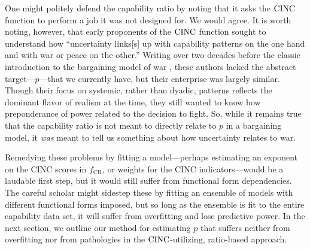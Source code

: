 One might politely defend the capability ratio by noting that it asks the $\operatorname{CINC}$ function to perform a job it was not designed for.
We would agree.
It is worth noting, however, that early proponents of the $\operatorname{CINC}$ function \citep[24]{singer1972} sought to understand how ``uncertainty links[s] up with capability patterns on the one hand and with war or peace on the other.''
Writing over two decades before the classic introduction to the bargaining model of war \citep{fearon1995}, these authors lacked the abstract target---$p$---that we currently have, but their enterprise was largely similar.
Though their focus on systemic, rather than dyadic, patterns reflects the dominant flavor of realism at the time, they still wanted to know how preponderance of power related to the decision to fight.
So, while it remains true that the capability ratio is not meant to directly relate to $p$ in a bargaining model, it \emph{was} meant to tell us something about how uncertainty relates to war.

Remedying these problems by fitting a model---perhaps estimating an exponent on the CINC scores in $f_{\text{CR}}$, or weights for the CINC indicators---would be a laudable first step, but it would still suffer from functional form dependencies.
The careful scholar might sidestep these by fitting an ensemble of models with different functional forms imposed, but so long as the ensemble is fit to the entire capability data set, it will suffer from overfitting and lose predictive power.
In the next section, we outline our method for estimating $p$ that suffers neither from overfitting nor from pathologies in the $\operatorname{CINC}$-utilizing, ratio-based approach.

